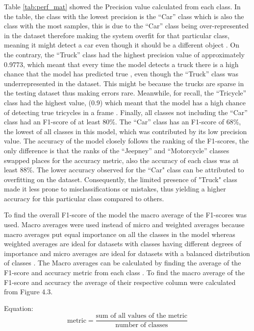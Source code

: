 Table \ref{tab:perf_mat} showed the Precision value calculated from each class. In the table, the class with the lowest precision is the “Car” class which is also the class with the most samples, this is due to the “Car” class being over-represented in the dataset therefore making the system overfit for that particular class, meaning it might detect a car even though it should be a different object \cite{Raj_2019}. On the contrary, the “Truck” class had the highest precision value of approximately 0.9773, which meant that every time the model detects a truck there is a high chance that the model has predicted true \cite{D_Powers}, even though the “Truck” class was underrepresented in the dataset. This might be because the trucks are sparse in the testing dataset thus making errors rare. Meanwhile, for recall, the “Tricycle” class had the highest value, (0.9) which meant that the model has a high chance of detecting true tricycles in a frame \cite{D_Powers}. Finally, all classes not including the “Car” class had an F1-score of at least 80\%. The “Car” class has an F1-score of 68\%, the lowest of all classes in this model, which was contributed by its low precision value. The accuracy of the model closely follows the ranking of the F1-scores, the only difference is that the ranks of the “Jeepney” and “Motorcycle” classes swapped places for the accuracy metric, also the accuracy of each class was at least 88\%. The lower accuracy observed for the ``Car" class can be attributed to overfitting on the dataset. Consequently, the limited presence of "Truck" class made it less prone to misclassifications or mistakes, thus yielding a higher accuracy for this particular class compared to others.


To find the overall F1-score of the model the macro average of the F1-scores was used. Macro averages were used instead of micro and weighted averages because macro averages put equal importance on all the classes in the model whereas weighted averages are ideal for datasets with classes having different degrees of importance and micro averages are ideal for datasets with a balanced distribution of classes \cite{Leung_2022}. The Macro averages can be calculated by finding the average of the F1-score and accuracy metric from each class \cite{Leung_2022}. To find the macro average of the F1-score and accuracy the average of their respective column were calculated from Figure 4.3.

Equation:
\begin{equation}
	{\text{metric}}= \frac{\text{sum of all values of the metric}}{\text{number of classes}} 
\end{equation}

